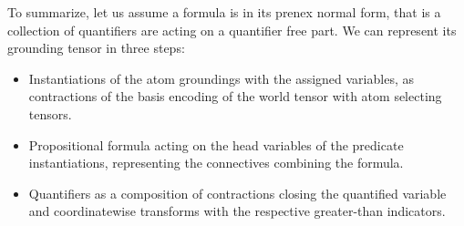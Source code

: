 To summarize, let us assume a formula is in its prenex normal form, that is a collection of quantifiers are acting on a quantifier free part.
We can represent its grounding tensor in three steps:
\begin{itemize}
    \item Instantiations of the atom groundings with the assigned variables, as contractions of the basis encoding of the world tensor with atom selecting tensors.
    \item Propositional formula acting on the head variables of the predicate instantiations, representing the connectives combining the formula.
    \item Quantifiers as a composition of contractions closing the quantified variable and coordinatewise transforms with the respective greater-than indicators.
\end{itemize}















